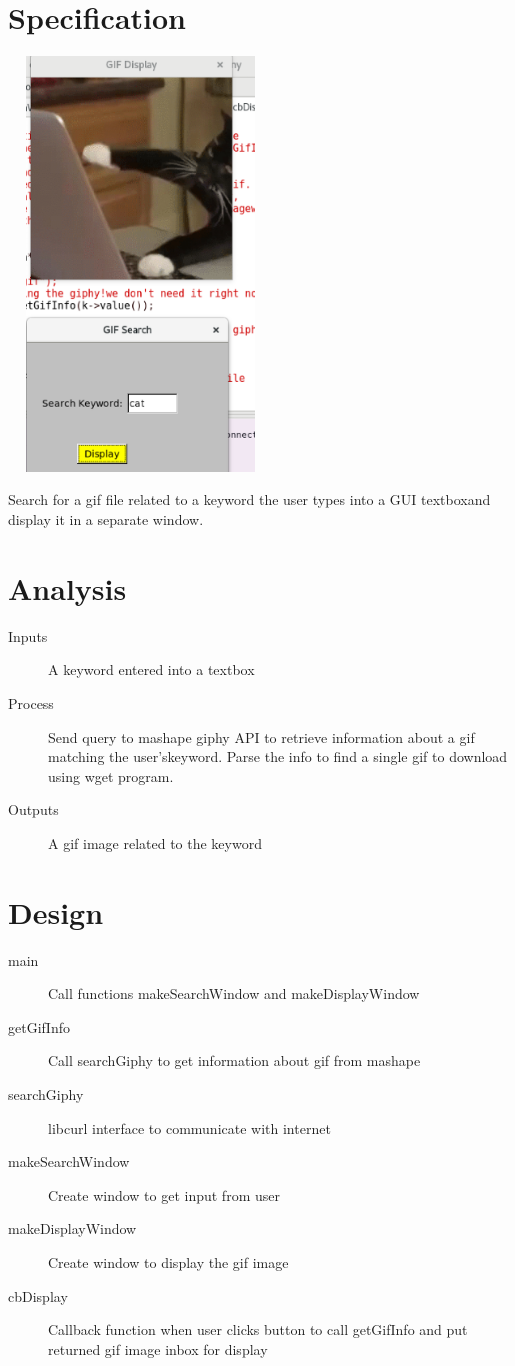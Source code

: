\documentclass{article}
\begin{document}
\large 
\section*{Specification}
\includegraphics[width = 7cm, height = 11cm]{cat.png}
\begin{description}
	\item Search for a gif file related to a keyword the user types into a GUI textboxand display it in a separate window. 
\end{description}
\newpage\section*{Analysis}
\begin{description}
	\item [Inputs]  A keyword entered into a textbox
	\item [Process]  Send query to mashape giphy API to retrieve information about a gif matching the user’skeyword.  Parse the info to find a single gif to download using wget program.
    \item [Outputs]  A gif image related to the keyword
\end{description}
\newpage\section*{Design}
\begin{description}
	\item [main]  Call functions makeSearchWindow and makeDisplayWindow
	\item [getGifInfo]  Call searchGiphy to get information about gif from mashape
    \item [searchGiphy]  libcurl interface to communicate with internet
    \item [makeSearchWindow]  Create window to get input from user
    \item [makeDisplayWindow]  Create window to display the gif image
    \item [cbDisplay]   Callback function when user clicks button to call getGifInfo and put returned gif image inbox for display
\end{description}
\end{document}
